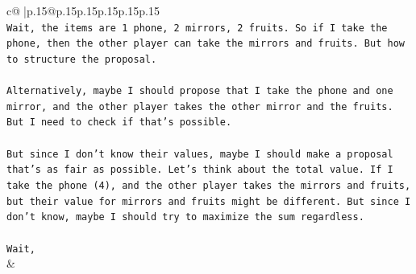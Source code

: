 \documentclass{article}
\begin{document}
{\begin{supertabular}{c@{$\;$}|p{.15\linewidth}@{}p{.15\linewidth}p{.15\linewidth}p{.15\linewidth}p{.15\linewidth}p{.15\linewidth}}
{{{\\ 
\texttt{Wait, the items are 1 phone, 2 mirrors, 2 fruits. So if I take the phone, then the other player can take the mirrors and fruits. But how to structure the proposal.} \\
\\ 
\texttt{Alternatively, maybe I should propose that I take the phone and one mirror, and the other player takes the other mirror and the fruits. But I need to check if that's possible.} \\
\\ 
\texttt{But since I don't know their values, maybe I should make a proposal that's as fair as possible. Let's think about the total value. If I take the phone (4), and the other player takes the mirrors and fruits, but their value for mirrors and fruits might be different. But since I don't know, maybe I should try to maximize the sum regardless.} \\
\\ 
\texttt{Wait,} \\
            }
        }
    }
    & \\ \\


\end{supertabular}}
\end{document}
